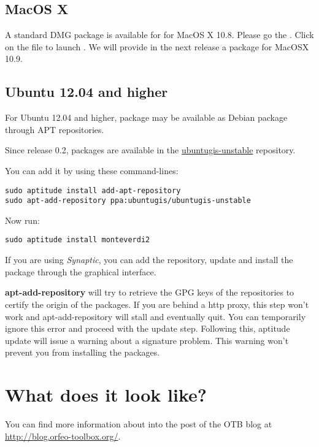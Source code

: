 \subsection{MacOS X}
A standard DMG package is available for \montNew for MacOS X 10.8. Please go the \download.
Click on the file to launch \montNew. We will provide in the next release a package for MacOSX 10.9.

\subsection{Ubuntu 12.04 and higher}
For Ubuntu 12.04 and higher, \montNew package may be available as Debian package through APT repositories.

Since release 0.2, \montNew packages are available in the
\href{https://launchpad.net/~ubuntugis/+archive/ubuntugis-unstable}{ubuntugis-unstable} repository.

You can add it by using these command-lines:
\begin{verbatim}
sudo aptitude install add-apt-repository
sudo apt-add-repository ppa:ubuntugis/ubuntugis-unstable
\end{verbatim}

Now run:
\begin{verbatim}
sudo aptitude install monteverdi2
\end{verbatim}

If you are using \emph{Synaptic}, you can add the repository, update and install the package through the
graphical interface.

\textbf{apt-add-repository} will try to retrieve the GPG keys of the
repositories to certify the origin of the packages. If you are behind a http
proxy, this step won't work and apt-add-repository will stall and eventually
quit. You can temporarily ignore this error and proceed with the update
step. Following this, aptitude update will issue a warning about a signature
problem. This warning won't prevent you from installing the packages.


\section{What does it look like?}

You can find more information about \montNew into the post of the OTB blog at \url{http://blog.orfeo-toolbox.org/}.

